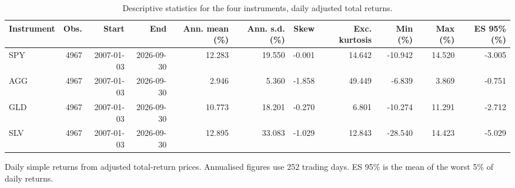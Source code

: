 \begin{table}[htbp]
\centering
\caption{Descriptive statistics for the four instruments, daily adjusted total returns.}
\label{tab:descriptive}
\begin{tabular}{lrrrrrrrrrr}
\toprule
Instrument & Obs. & Start & End & Ann. mean (\%) & Ann. s.d. (\%) & Skew & Exc. kurtosis & Min (\%) & Max (\%) & ES 95\% (\%) \\
\midrule
SPY & 4967 & 2007-01-03 & 2026-09-30 & 12.283 & 19.550 & -0.001 & 14.642 & -10.942 & 14.520 & -3.005 \\
AGG & 4967 & 2007-01-03 & 2026-09-30 & 2.946 & 5.360 & -1.858 & 49.449 & -6.839 & 3.869 & -0.751 \\
GLD & 4967 & 2007-01-03 & 2026-09-30 & 10.773 & 18.201 & -0.270 & 6.801 & -10.274 & 11.291 & -2.712 \\
SLV & 4967 & 2007-01-03 & 2026-09-30 & 12.895 & 33.083 & -1.029 & 12.843 & -28.540 & 14.423 & -5.029 \\
\bottomrule
\end{tabular}
\begin{minipage}{\linewidth}\footnotesize Daily simple returns from adjusted total-return prices. Annualised figures use 252 trading days. ES 95\% is the mean of the worst 5\% of daily returns.\end{minipage}
\end{table}
